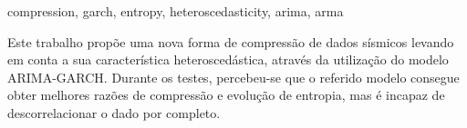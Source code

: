 
\begin{englishabstract}{}{compression, garch, entropy, heteroscedasticity,
arima, arma}


Este trabalho propõe uma nova forma de compressão de dados sísmicos levando em
conta a sua característica heteroscedástica, através da utilização do modelo
ARIMA-GARCH. Durante os testes, percebeu-se que o referido modelo consegue obter
melhores razões de compressão e evolução de entropia, mas é incapaz de
descorrelacionar o dado por completo.

\end{englishabstract}

